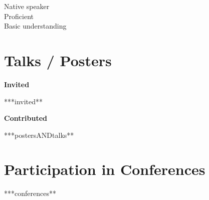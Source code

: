 \documentclass[10pt]{article}
\renewcommand{\labelenumi}{-\label{A\theenumi}}
\begin{document}
\begin{minipage}{\linewidth}
\begin{multicols}{4}
\begin{itemize}
        \skills{~}{}
        \skills{~}{}
        \end{itemize}
      \end{multicols}
      \begin{minipage}{0.5\linewidth}
        \begin{footnotesize}
        \raggedleft
           Native speaker \threeskill \\
          Proficient \twoskill \\
          Basic understanding \oneskill \\
        \end{footnotesize}
      \end{minipage}

  \end{minipage}

\fi


\newpage
\section{Talks / Posters}

\textbf{Invited}
\begin{enumerate}

  ***invited**

\end{enumerate}

\textbf{Contributed}
\renewcommand{\labelenumi}{[P\arabic{enumi}] }
\begin{enumerate}

  ***postersANDtalks**

\end{enumerate}


\ifconferences

  \section{Participation in Conferences}
  \begin{itemize}

    ***conferences**

  \end{itemize}

\fi


\ifreferees
\end{document}
